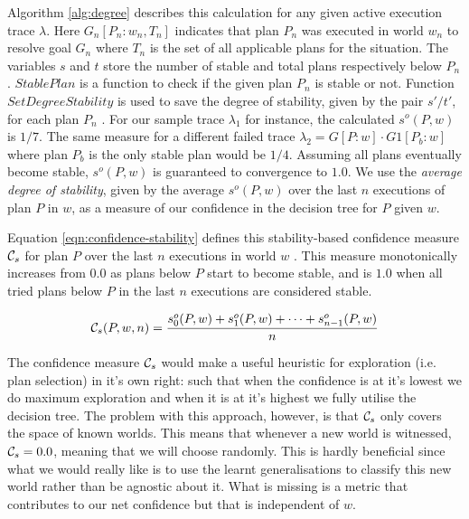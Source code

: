Algorithm \ref{alg:degree} describes this calculation for any given active execution trace $\lambda$. Here $G_n[P_n:w_n,T_n]$ indicates that plan $P_n$ was executed in world $w_n$ to resolve goal $G_n$ where $T_n$ is the set of all applicable plans for the situation. The variables $s$ and $t$ store the number of stable and total plans respectively below $P_n$. $StablePlan$ is a function to check if the given plan $P_n$ is stable or not. Function $SetDegreeStability$ is used to save the degree of stability, given by the pair $s'/t'$, for each plan $P_n$ . For our sample trace $\lambda_1$ for instance, the calculated $s^o(P,w)$ is $1/7$. The same measure for a different failed trace $\lambda_2=G[P:w] \cdot G1[P_b:w]$ where plan $P_b$ is the only stable plan would be $1/4$. Assuming all plans eventually become stable, $s^o(P,w)$ is guaranteed to convergence to $1.0$. We use the {\em average degree of stability}, given by the average $s^o(P,w)$ over the last $n$ executions of plan $P$ in $w$, as a measure of our confidence in the decision tree for $P$ given $w$.

\begin{algorithm}[ht]
\caption{$UpdateDegreeStability(\lambda, s, t, k, \epsilon)$}
\label{alg:degree}
\end{algorithm}

Equation \ref{eqn:confidence-stability} defines this stability-based confidence measure ${\mathcal{C}}_s$ for plan $P$ over the last $n$ executions in world $w$ . This measure monotonically increases from $0.0$ as plans below $P$ start to become stable, and is $1.0$ when all tried plans below $P$ in the last $n$ executions are considered stable. 

\begin{equation}
{\ensuremath{\mathcal{C}}}_s(P,w,n) = \frac{s^o_0(P,w) + s^o_1(P,w) + \cdots + s^o_{n-1}(P,w)}{n}
\label{eqn:confidence-stability}
\end{equation}


The confidence measure ${\mathcal{C}}_s$ would make a useful heuristic for exploration (i.e. plan selection) in it's own right: such that when the confidence is at it's lowest we do maximum exploration and when it is at it's highest we fully utilise the decision tree. The problem with this approach, however, is that ${\mathcal{C}}_s$ only covers the space of known worlds. This means that whenever a new world is witnessed, ${\mathcal{C}}_s=0.0$, meaning that we will choose randomly. This is hardly beneficial since what we would really like is to use the learnt generalisations to classify this new world rather than be agnostic about it. What is missing is a metric that contributes to our net confidence but that is independent of $w$.

